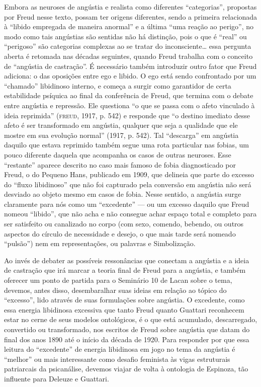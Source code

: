 Embora as neuroses de angústia e realista como diferentes
``categorias'', propostas por Freud nesse texto, possam ter origens
diferentes, sendo a primeira relacionada à ``libido empregada de maneira
anormal'' e a última ``uma reação ao perigo'', no modo como tais
angústias são sentidas não há distinção, pois o que é ``real'' ou
``perigoso'' são categorias complexas ao se tratar do
inconsciente\ldots{} essa pergunta aberta é retomada nas décadas
seguintes, quando Freud trabalha com o conceito de ``angústia de
castração''. É necessário também introduzir outro fator que Freud
adiciona: o das oposições entre ego e libido. O ego está sendo
confrontado por um ``chamado'' libidinoso interno, e começa a surgir
como garantidor de certa estabilidade psíquica ao final da conferência
de Freud, que termina com o debate entre angústia e repressão. Ele
questiona ``o que se passa com o afeto vinculado à ideia reprimida''
(\textsc{freud}, 1917, p. 542) e responde que ``o destino imediato desse afeto é
ser transformado em angústia, qualquer que seja a qualidade que ele
mostre em sua evolução normal'' (1917, p. 542). Tal ``descarga''
em angústia daquilo que estava reprimido também segue uma rota
particular nas fobias, um pouco diferente daquela que acompanha os casos
de outras neuroses. Esse ``restante'' aparece descrito no caso mais
famoso de fobia diagnosticado por Freud, o do Pequeno Hans, publicado em
1909, que delineia que parte do excesso do ``fluxo libidinoso'' que não
foi capturado pela conversão em angústia não será desviado ao objeto
mesmo em casos de fobia. Nesse sentido, a angústia surge claramente para
nós como um ``excedente'' --- ou um excesso daquilo que Freud nomeou
``libido'', que não acha e não consegue achar espaço total e completo
para ser satisfeito ou canalizado no corpo (com sexo, comendo, bebendo,
ou outros aspectos do círculo de necessidade e desejo, o que mais tarde
será nomeado ``pulsão'') nem em representações, ou palavras e
Simbolização.

Ao invés de debater as possíveis ressonâncias que conectam a angústia e
a ideia de castração que irá marcar a teoria final de Freud para a
angústia, e também oferecer um ponto de partida para o Seminário 10 de
Lacan sobre o tema, devemos, antes disso, desembaralhar suas ideias em
relação ao tópico do ``excesso'', lido através de suas formulações sobre
angústia. O excedente, como essa energia libidinosa excessiva que tanto
Freud quanto Guattari reconhecem estar no cerne de seus modelos
ontológicos, é o que está acumulado, descarregado, convertido ou
transformado, nos escritos de Freud sobre angústia que datam do final
dos anos 1890 até o início da década de 1920. Para responder por que
essa leitura do ``excedente'' de energia libidinosa em jogo no tema da
angústia é ``melhor'' ou mais interessante como desafio feminista às
vigas estruturais patriarcais da psicanálise, devemos viajar de volta à
ontologia de Espinoza, tão influente para Deleuze e Guattari.

